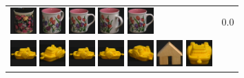\begin{figure}[tbp]
\begin{center}
\begin{tabular}{m{11cm} | m{3cm} |}
\includegraphics[width=1cm]{coil/beeld-62.eps}
\includegraphics[width=1cm]{coil/beeld-9.eps}
\includegraphics[width=1cm]{coil/beeld-6.eps}
\includegraphics[width=1cm]{coil/beeld-10.eps}
\includegraphics[width=1cm]{coil/beeld-6.eps}
& {\scriptsize 0.0}
\\
\includegraphics[width=1cm]{coil/beeld-12.eps}
\includegraphics[width=1cm]{coil/beeld-15.eps}
\includegraphics[width=1cm]{coil/beeld-12.eps}
\includegraphics[width=1cm]{coil/beeld-13.eps}
\includegraphics[width=1cm]{coil/beeld-16.eps}
\includegraphics[width=1cm]{coil/beeld-42.eps}
\includegraphics[width=1cm]{coil/beeld-14.eps}

\end{tabular}
\end{center}
\end{figure}

